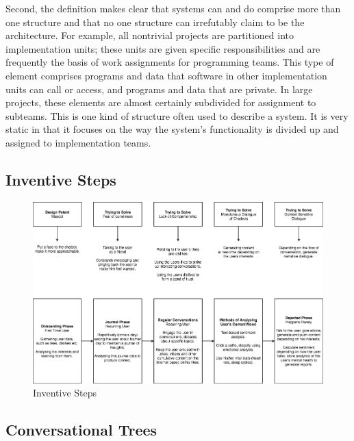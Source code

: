 \pagebreak

Second, the definition makes clear that systems can and do comprise more than one structure and that no one structure can irrefutably
claim to be the architecture. For example, all nontrivial projects are partitioned into implementation units; these units are given specific
responsibilities and are frequently the basis of work assignments for programming teams. This type of element comprises programs and
data that software in other implementation units can call or access, and programs and data that are private. In large projects, these
elements are almost certainly subdivided for assignment to subteams. This is one kind of structure often used to describe a system. It is
very static in that it focuses on the way the system's functionality is divided up and assigned to implementation teams.

\subsection{Inventive Steps}

\begin{figure}[H]
    \centering
    \includegraphics[width=\linewidth]{images/inventive-steps.png}
    \caption{Inventive Steps}
    \label{fig:inventive-steps}
\end{figure}

\subsection{Conversational Trees}


